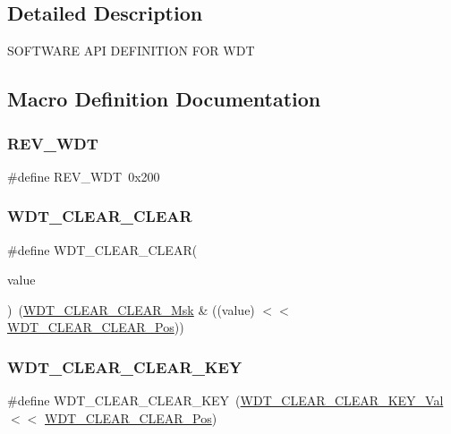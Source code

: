 \subsection{Detailed Description}
S\+O\+F\+T\+W\+A\+RE A\+PI D\+E\+F\+I\+N\+I\+T\+I\+ON F\+OR W\+DT 

\subsection{Macro Definition Documentation}
\mbox{\label{group___s_a_m_d21___w_d_t_ga2a81abc78d42c7d555d128b152388248}} 
\subsubsection{\texorpdfstring{REV\_WDT}{REV\_WDT}}
{\footnotesize\ttfamily \#define R\+E\+V\+\_\+\+W\+DT~0x200}

\mbox{\label{group___s_a_m_d21___w_d_t_ga5dceacac040596ca3a0941aad227e014}} 
\subsubsection{\texorpdfstring{WDT\_CLEAR\_CLEAR}{WDT\_CLEAR\_CLEAR}}
{\footnotesize\ttfamily \#define W\+D\+T\+\_\+\+C\+L\+E\+A\+R\+\_\+\+C\+L\+E\+AR(\begin{DoxyParamCaption}\item[{}]{value }\end{DoxyParamCaption})~(\mbox{\hyperlink{group___s_a_m_d21___w_d_t_gac9c6223ece162be430a8f86942210ba9}{W\+D\+T\+\_\+\+C\+L\+E\+A\+R\+\_\+\+C\+L\+E\+A\+R\+\_\+\+Msk}} \& ((value) $<$$<$ \mbox{\hyperlink{group___s_a_m_d21___w_d_t_ga3059b0505f94ff8b2ff25fb53dd56999}{W\+D\+T\+\_\+\+C\+L\+E\+A\+R\+\_\+\+C\+L\+E\+A\+R\+\_\+\+Pos}}))}

\mbox{\label{group___s_a_m_d21___w_d_t_gad9b9dfd240e353ca00f7417e8cbbb637}} 
\subsubsection{\texorpdfstring{WDT\_CLEAR\_CLEAR\_KEY}{WDT\_CLEAR\_CLEAR\_KEY}}
{\footnotesize\ttfamily \#define W\+D\+T\+\_\+\+C\+L\+E\+A\+R\+\_\+\+C\+L\+E\+A\+R\+\_\+\+K\+EY~(\mbox{\hyperlink{group___s_a_m_d21___w_d_t_gab9d83e2ecab22a9b789e5db90483a784}{W\+D\+T\+\_\+\+C\+L\+E\+A\+R\+\_\+\+C\+L\+E\+A\+R\+\_\+\+K\+E\+Y\+\_\+\+Val}}       $<$$<$ \mbox{\hyperlink{group___s_a_m_d21___w_d_t_ga3059b0505f94ff8b2ff25fb53dd56999}{W\+D\+T\+\_\+\+C\+L\+E\+A\+R\+\_\+\+C\+L\+E\+A\+R\+\_\+\+Pos}})}

